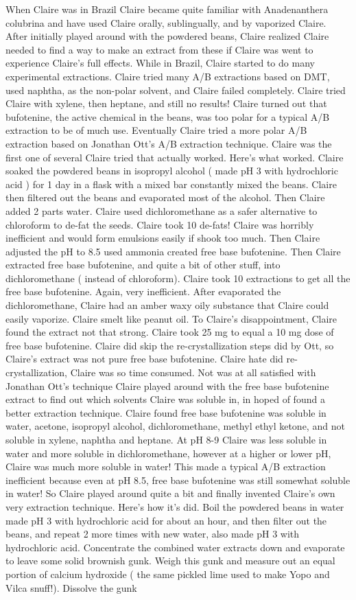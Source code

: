 \documentclass[12pt]{book}
\begin{document}
When Claire was in Brazil Claire became quite familiar with Anadenanthera colubrina and have used Claire orally, sublingually, and by vaporized Claire. After initially played around with the powdered beans, Claire realized Claire needed to find a way to make an extract from these if Claire was went to experience Claire's full effects. While in Brazil, Claire started to do many experimental extractions. Claire tried many A/B extractions based on DMT, used naphtha, as the non-polar solvent, and Claire failed completely. Claire tried Claire with xylene, then heptane, and still no results! Claire turned out that bufotenine, the active chemical in the beans, was too polar for a typical A/B extraction to be of much use. Eventually Claire tried a more polar A/B extraction based on Jonathan Ott's A/B extraction technique. Claire was the first one of several Claire tried that actually worked. Here's what worked. Claire soaked the powdered beans in isopropyl alcohol ( made pH 3 with hydrochloric acid ) for 1 day in a flask with a mixed bar constantly mixed the beans. Claire then filtered out the beans and evaporated most of the alcohol. Then Claire added 2 parts water. Claire used dichloromethane as a safer alternative to chloroform to de-fat the seeds. Claire took 10 de-fats! Claire was horribly inefficient and would form emulsions easily if shook too much. Then Claire adjusted the pH to 8.5 used ammonia created free base bufotenine. Then Claire extracted free base bufotenine, and quite a bit of other stuff, into dichloromethane ( instead of chloroform). Claire took 10 extractions to get all the free base bufotenine. Again, very inefficient. After evaporated the dichloromethane, Claire had an amber waxy oily substance that Claire could easily vaporize. Claire smelt like peanut oil. To Claire's disappointment, Claire found the extract not that strong. Claire took 25 mg to equal a 10 mg dose of free base bufotenine. Claire did skip the re-crystallization steps did by Ott, so Claire's extract was not pure free base bufotenine. Claire hate did re-crystallization, Claire was so time consumed. Not was at all satisfied with Jonathan Ott's technique Claire played around with the free base bufotenine extract to find out which solvents Claire was soluble in, in hoped of found a better extraction technique. Claire found free base bufotenine was soluble in water, acetone, isopropyl alcohol, dichloromethane, methyl ethyl ketone, and not soluble in xylene, naphtha and heptane. At pH 8-9 Claire was less soluble in water and more soluble in dichloromethane, however at a higher or lower pH, Claire was much more soluble in water! This made a typical A/B extraction inefficient because even at pH 8.5, free base bufotenine was still somewhat soluble in water! So Claire played around quite a bit and finally invented Claire's own very extraction technique. Here's how it's did. Boil the powdered beans in water made pH 3 with hydrochloric acid for about an hour, and then filter out the beans, and repeat 2 more times with new water, also made pH 3 with hydrochloric acid. Concentrate the combined water extracts down and evaporate to leave some solid brownish gunk. Weigh this gunk and measure out an equal portion of calcium hydroxide ( the same pickled lime used to make Yopo and Vilca snuff!). Dissolve the gunk 
\end{document}
